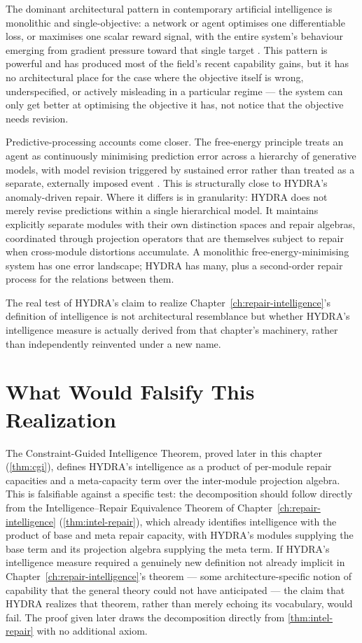 \documentclass[12pt,twoside,openright]{book}
\begin{document}
The dominant architectural pattern in contemporary artificial
intelligence is monolithic and single-objective: a network
or agent optimises one differentiable loss, or maximises one
scalar reward signal, with the entire system's behaviour
emerging from gradient pressure toward that single target
\parencite{sutton2018}. This pattern is powerful and has
produced most of the field's recent capability gains, but it
has no architectural place for the case where the objective
itself is wrong, underspecified, or actively misleading in a
particular regime --- the system can only get better at
optimising the objective it has, not notice that the objective
needs revision.

Predictive-processing accounts come closer. The free-energy
principle treats an agent as continuously minimising prediction
error across a hierarchy of generative models, with model
revision triggered by sustained error rather than treated as a
separate, externally imposed event \parencite{friston2010}.
This is structurally close to HYDRA's anomaly-driven repair.
Where it differs is in granularity: HYDRA does not merely
revise predictions within a single hierarchical model. It
maintains explicitly separate modules with their own
distinction spaces and repair algebras, coordinated through
projection operators that are themselves subject to repair when
cross-module distortions accumulate. A monolithic
free-energy-minimising system has one error landscape; HYDRA
has many, plus a second-order repair process for the relations
between them.

The real test of HYDRA's claim to realize
Chapter~\ref{ch:repair-intelligence}'s definition of
intelligence is not architectural resemblance but whether
HYDRA's intelligence measure is actually derived from that
chapter's machinery, rather than independently reinvented under
a new name.

\section{What Would Falsify This Realization}
\label{sec:ch25-falsifiability}

The Constraint-Guided Intelligence Theorem, proved later in
this chapter (\cref{thm:cgi}), defines HYDRA's intelligence as
a product of per-module repair capacities and a meta-capacity
term over the inter-module projection algebra. This is
falsifiable against a specific test: the decomposition should
follow directly from the Intelligence--Repair Equivalence
Theorem of Chapter~\ref{ch:repair-intelligence}
(\cref{thm:intel-repair}), which already identifies
intelligence with the product of base and meta repair
capacity, with HYDRA's modules supplying the base term and its
projection algebra supplying the meta term. If HYDRA's
intelligence measure required a genuinely new definition not
already implicit in Chapter~\ref{ch:repair-intelligence}'s
theorem --- some architecture-specific notion of capability
that the general theory could not have anticipated --- the
claim that HYDRA realizes that theorem, rather than merely
echoing its vocabulary, would fail. The proof given later
draws the decomposition directly from
\cref{thm:intel-repair} with no additional axiom.
\end{document}
